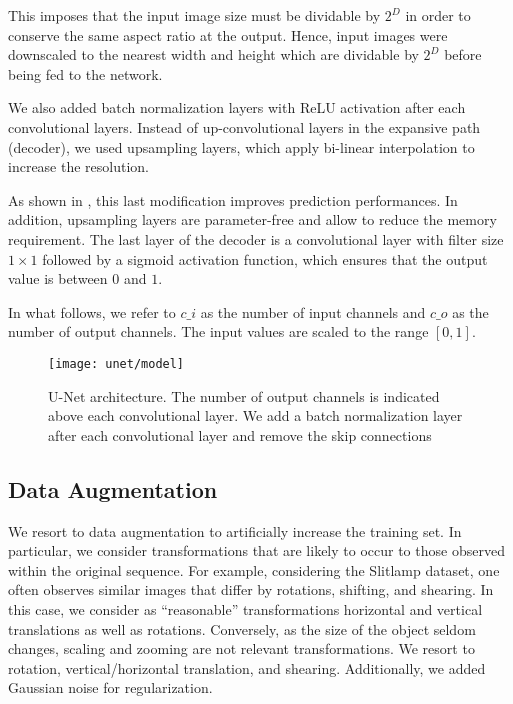This imposes that the input image size must be dividable by $2^{D}$ in order to conserve the same aspect ratio at the output.
Hence, input images were downscaled to the nearest width and height which are dividable by $2^{D}$ before being fed to the network.

We also added batch normalization layers with ReLU activation after each convolutional layers.
Instead of up-convolutional layers in the expansive path (decoder), we used upsampling layers, which apply bi-linear interpolation to increase the resolution.

As shown in \cite{vorontsov17}, this last modification improves prediction performances.
In addition, upsampling layers are parameter-free and allow to reduce the memory requirement.
The last layer of the decoder is a convolutional layer with filter size $1 \times 1$ followed by a sigmoid activation function, which ensures that the output value is between $0$ and $1$.

In what follows, we refer to $c\_i$ as the number of input channels and $c\_o$ as the number of output channels.
The input values are scaled to the range $[0,1]$.

\clearpage
\begin{figure}[!htbp]
  \centering
  \texttt{[image: unet/model]}
  \caption[Modified U-Net architecture]{U-Net architecture.
    The number of output channels is indicated above each convolutional layer.
    We add a batch normalization layer after each convolutional layer and remove the skip connections}
  \label{fig:unet_model}
\end{figure}

\subsection{Data Augmentation} \label{ch:data_gen}
We resort to data augmentation to artificially increase the training set.
In particular, we consider transformations that are likely to occur to those observed within the original sequence.
For example, considering the Slitlamp dataset, one often observes similar images that differ by rotations, shifting, and shearing.
In this case, we consider as ``reasonable'' transformations horizontal and vertical translations as well as rotations.
Conversely, as the size of the object seldom changes, scaling and zooming are not relevant transformations.
We resort to rotation, vertical/horizontal translation, and shearing.
Additionally, we added Gaussian noise for regularization.


